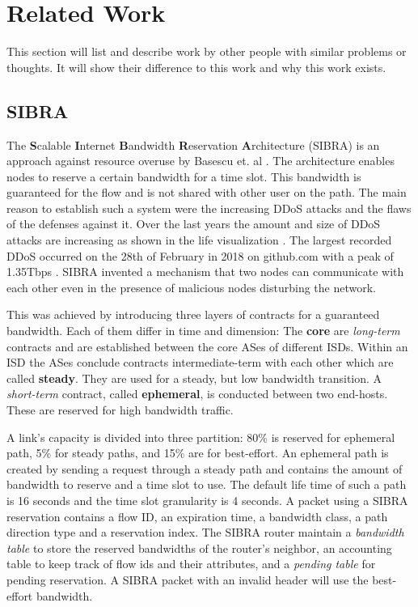 \documentclass[thesis.tex]{subfiles}
\begin{document}
\section{Related Work}\label{chap:prevwork}

This section will list and describe work by other people with similar problems or thoughts. It will show their difference to this work and why this work exists.

\subsection{SIBRA} \label{sec:prevwork:sibra}

The \textbf{S}calable \textbf{I}nternet \textbf{B}andwidth \textbf{R}eservation \textbf{A}rchitecture (SIBRA) is an approach against resource overuse by Basescu et. al \cite{Basescu.2016}. The architecture enables nodes to reserve a certain bandwidth for a time slot. This bandwidth is guaranteed for the flow and is not shared with other user on the path. The main reason to establish such a system were the increasing DDoS attacks and the flaws of the defenses against it. Over the last years the amount and size of DDoS attacks are increasing as shown in the life visualization \cite{GoogleInc.2013}. The largest recorded DDoS occurred on the 28th of February in 2018 on github.com with a peak of 1.35Tbps \cite{Kottler.01.03.2018}. SIBRA invented a mechanism that two nodes can communicate with each other even in the presence of malicious nodes disturbing the network.

This was achieved by introducing three layers of contracts for a guaranteed bandwidth. Each of them differ in time and dimension: The \textbf{core} are \textit{long-term} contracts and are established between the core ASes of different ISDs. Within an ISD the ASes conclude contracts intermediate-term with each other which are called \textbf{steady}. They are used for a steady, but low bandwidth transition. A \textit{short-term} contract, called \textbf{ephemeral}, is conducted between two end-hosts. These are reserved for high bandwidth traffic. 

A link's capacity is divided into three partition: 80\% is reserved for ephemeral path, 5\% for steady paths, and 15\% are for best-effort. An ephemeral path is created by sending a request through a steady path and contains the amount of bandwidth to reserve and a time slot to use. The default life time of such a path is 16 seconds and the time slot granularity is 4 seconds. A packet using a SIBRA reservation contains a flow ID, an expiration time, a bandwidth class, a path direction type and a reservation index. The SIBRA router maintain a \textit{bandwidth table} to store the reserved bandwidths of the router's neighbor, an accounting table to keep track of flow ids and their attributes, and a \textit{pending table} for pending reservation. A SIBRA packet with an invalid header will use the best-effort bandwidth.
\end{document}
